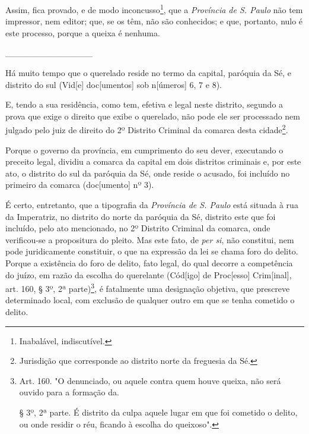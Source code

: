 Assim, fica provado, e de modo inconcusso\footnote{Inabalável,
  indiscutível.}, que a \emph{Província de S. Paulo} não tem impressor,
nem editor; que, se os têm, não são conhecidos; e que, portanto, nulo é
este processo, porque a queixa é nenhuma.

\_\_\_\_\_\_\_\_\_\_\_\_\_\_

Há muito tempo que o querelado reside no termo da capital, paróquia da
Sé, e distrito do sul (Vid{[}e{]} doc{[}umentos{]} sob n{[}úmeros{]} 6,
7 e 8).

E, tendo a sua residência, como tem, efetiva e legal neste distrito,
segundo a prova que exige o direito que exibe o querelado, não pode ele
ser processado nem julgado pelo juiz de direito do 2º Distrito Criminal
da comarca desta cidade\footnote{Jurisdição que corresponde ao distrito
  norte da freguesia da Sé.}.

Porque o governo da província, em cumprimento do seu dever, executando o
preceito legal, dividiu a comarca da capital em dois distritos criminais
e, por este ato, o distrito do sul da paróquia da Sé, onde reside o
acusado, foi incluído no primeiro da comarca (doc{[}umento{]} nº 3).

É certo, entretanto, que a tipografia da \emph{Província de S. Paulo}
está situada à rua da Imperatriz, no distrito do norte da paróquia da
Sé, distrito este que foi incluído, pelo ato mencionado, no 2º Distrito
Criminal da comarca, onde verificou-se a propositura do pleito. Mas este
fato, de \emph{per si}, não constitui, nem pode juridicamente
constituir, o que na expressão da lei se chama foro do delito. Porque a
existência do foro de delito, fato legal, do qual decorre a competência
do juízo, em razão da escolha do querelante (Cód{[}igo{]} de
Proc{[}esso{]} Crim{[}inal{]}, art. 160, § 3º, 2ª parte)\footnote{Art.
  160. "O denunciado, ou aquele contra quem houve queixa, não será
  ouvido para a formação da.

  § 3º, 2ª parte. É distrito da culpa aquele lugar em que foi cometido o
  delito, ou onde residir o réu, ficando à escolha do queixoso".}, é
fatalmente uma designação objetiva, que prescreve determinado local, com
exclusão de qualquer outro em que se tenha cometido o delito.

